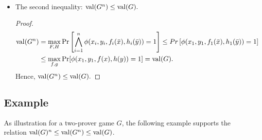 \begin{itemize}
\begin{proof}
$(f,h)$ is the optimal couple of strategies for the game $G$, this does not means that the couple $(F,H)$  is the optimal couple of the strategies for the parallel repetition $G^n$. Then, the winning probability for $G^n$ over the optimal couple of strategies is:
\begin{align*}
\val (G^n)= & \max\limits_{F,H} \Pr \left[\bigwedge\limits_{i=1}^n \phi (x_i,y_i, f_i(\bar{x}), h_i(\bar{y}))=1 \right] 
 \geq  \Pr \left[\bigwedge\limits_{i=1}^n \phi (x_i,y_i, f_i(\bar{x}), h_i(\bar{y}))=1 \right] \\
 = & \prod\limits_{i=1}^n \Pr \left[ \phi (x_i,y_i, f(\bar{x}), h(\bar{y}))=1 \right]  =  \prod\limits_{i=1}^n \val (G)  =  \val (G)^n .
\end{align*}

Hence, $\val (G^n) \geq \val (G)^n.$
\end{proof}

\item The second inequality: $\mathrm{val} (G^n) \leq \mathrm{val} (G).$
\begin{proof}
 \begin{align*}
 \mathrm{val} (G^n) & = \max\limits_{F,H} \Pr \left[\bigwedge\limits_{i=1}^n \phi (x_i,y_i, f_i(\bar{x}), h_i(\bar{y}))=1 \right] \leq Pr \left[ \phi (x_1,y_1, f_1(\bar{x}), h_1(\bar{y}))=1 \right] \\
 &  \leq \max\limits_{f,g} \Pr[\phi(x_1,y_1,f(x),h(y))=1]  = \mathrm{val} (G).
 \end{align*}
Hence, $\mathrm{val} (G^n) \leq \mathrm{val} (G).$
\end{proof}
\end{itemize}

\subsection{Example}
As illustration for a two-prover game $G$, the following example supports the relation  $\mathrm{val} (G)^n \leq \mathrm{val} (G^n) \leq \mathrm{val} (G)$.

